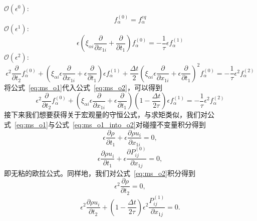 \noindent
$\mathcal{O}\left(\epsilon^{0}\right):$
\begin{equation}
f_{\alpha}^{(0)}=f_{\alpha}^{e q}
\end{equation}
$\mathcal{O}\left(\epsilon^{1}\right):$
\begin{equation}
\epsilon\left(\xi_{\alpha i} \frac{\partial}{\partial x_{1 i}}+\frac{\partial}{\partial t_{1}}\right) f_{\alpha}^{(0)}=-\frac{1}{\tau} \epsilon f_{\alpha}^{(1)}
\label{eq:ms_o1}
\end{equation}
$\mathcal{O}\left(\epsilon^{2}\right):$
\begin{equation}
\epsilon^{2} \frac{\partial}{\partial t_{2}} f_{\alpha}^{(0)}+\left(\xi_{\alpha i} \epsilon \frac{\partial}{\partial x_{1 i}}+\epsilon \frac{\partial}{\partial t_{1}}\right) \epsilon f_{\alpha}^{(1)}+\frac{\Delta t}{2}\left(\xi_{\alpha i} \epsilon \frac{\partial}{\partial x_{1 i}}+\epsilon \frac{\partial}{\partial t_{1}}\right)^{2} f_{\alpha}^{(0)}=-\frac{1}{\tau} \epsilon^{2} f_{\alpha}^{(2)}
\label{eq:ms_o2}
\end{equation}
将公式~\ref{eq:ms_o1}代入公式~\ref{eq:ms_o2}，可以得到
\begin{equation}
\epsilon^{2} \frac{\partial}{\partial t_{2}} f_{\alpha}^{(0)}+\left(\xi_{\alpha i} \epsilon \frac{\partial}{\partial x_{1 i}}+\epsilon \frac{\partial}{\partial t_{1}}\right)\left(1-\frac{\Delta t}{2 \tau}\right) \epsilon f_{\alpha}^{(1)}=-\frac{1}{\tau} \epsilon^{2} f_{\alpha}^{(2)}
\label{eq:ms_o1_into_o2}
\end{equation}
接下来我们想要获得关于宏观量的守恒公式，与求矩类似，我们对公式~\ref{eq:ms_o1}与公式~\ref{eq:ms_o1_into_o2}对碰撞不变量积分得到
\begin{equation}
\epsilon \frac{\partial \rho}{\partial t_{1}}+\epsilon \frac{\partial \rho u_{i}}{\partial x_{1 i}}=0,
\label{eq:ms_moment_o1_a}
\end{equation}
\begin{equation}
\epsilon \frac{\partial \rho u_{i}}{\partial t_{1}}+\epsilon \frac{\partial P_{i j}^{(0)}}{\partial x_{1 j}}=0,
\label{eq:ms_moment_o1_b}
\end{equation}
即无粘的欧拉公式。同样地，我们对公式~\ref{eq:ms_o2}积分得到
\begin{equation}
\epsilon^{2} \frac{\partial \rho}{\partial t_{2}} = 0,
\end{equation}
\begin{equation}
\epsilon^{2} \frac{\partial \rho u_{i}}{\partial t_{2}} +\left(1-\frac{\Delta t}{2 \tau}\right) \epsilon^{2} \frac{P_{i j}^{(1)}}{\partial x_{1 j}}=0 .
\end{equation}
